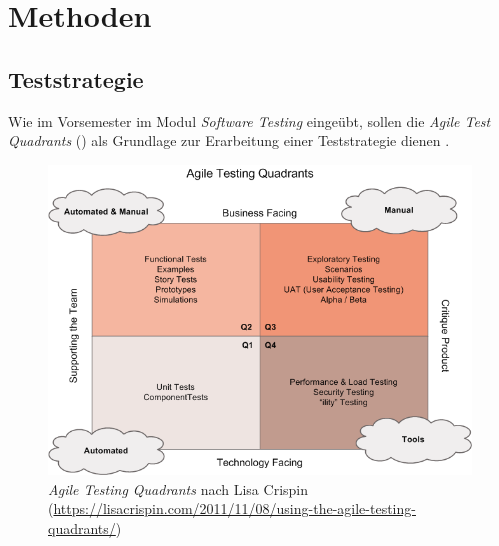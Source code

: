\section{Methoden}

\subsection{Teststrategie}

Wie im Vorsemester im Modul \textit{Software Testing} eingeübt, sollen die \textit{Agile Test Quadrants} () als Grundlage zur Erarbeitung einer Teststrategie dienen \cite[p. XX]{agiletest}.

\begin{figure}
	\centering
	\includegraphics[width=\linewidth]{pics/agile-testing-quadrants.png}
	\caption{\textit{Agile Testing Quadrants} nach Lisa Crispin (\url{https://lisacrispin.com/2011/11/08/using-the-agile-testing-quadrants/})}
	\label{fig:agile-testing-quadrants}
\end{figure}
